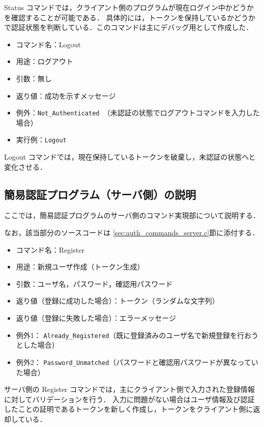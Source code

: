 \documentclass[11pt]{jsarticle}
\begin{document}
Status コマンドでは，クライアント側のプログラムが現在ログイン中かどうかを確認することが可能である．
具体的には，トークンを保持しているかどうかで認証状態を判断している．このコマンドは主にデバッグ用として作成した．

\begin{itemize}
  \item コマンド名：Logout
  \item 用途：ログアウト
  \item 引数：無し
  \item 返り値：成功を示すメッセージ
  \item 例外：{\tt Not\_Authenticated }（未認証の状態でログアウトコマンドを入力した場合）
  \item 実行例：{\tt Logout}
\end{itemize}

Logout コマンドでは，現在保持しているトークンを破棄し，未認証の状態へと変化させる．

\subsection{簡易認証プログラム（サーバ側）の説明}

ここでは，簡易認証プログラムのサーバ側のコマンド実現部について説明する．

なお，該当部分のソースコードは \ref{sec:auth_commands_server.c}節に添付する．

\begin{itemize}
  \item コマンド名：Register
  \item 用途：新規ユーザ作成（トークン生成）
  \item 引数：ユーザ名，パスワード，確認用パスワード
  \item 返り値（登録に成功した場合）：トークン（ランダムな文字列）
  \item 返り値（登録に失敗した場合）：エラーメッセージ
  \item 例外1： {\tt Already\_Registered}（既に登録済みのユーザ名で新規登録を行おうとした場合）
  \item 例外2： {\tt Password\_Unmatched}（パスワードと確認用パスワードが異なっていた場合）
\end{itemize}

サーバ側の Register コマンドでは，主にクライアント側で入力された登録情報に対してバリデーションを行う．
入力に問題がない場合はユーザ情報及び認証したことの証明であるトークンを新しく作成し，トークンをクライアント側に返却している．
\end{document}
